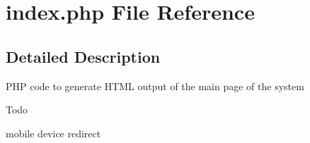 \section{index.\+php File Reference}
\label{index_8php}


\subsection{Detailed Description}
P\+HP code to generate H\+T\+ML output of the main page of the system

\begin{DoxyRefDesc}{Todo}
\item[{\bf Todo}]mobile device redirect \end{DoxyRefDesc}
